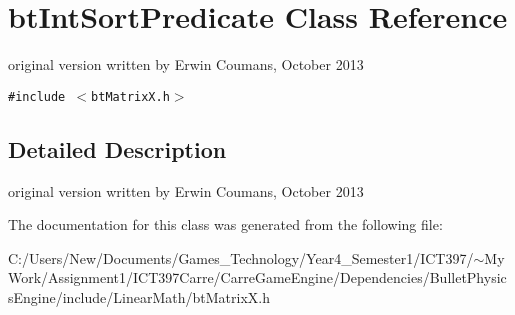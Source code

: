 \hypertarget{classbt_int_sort_predicate}{
\section{btIntSortPredicate Class Reference}
\label{classbt_int_sort_predicate}
}
original version written by Erwin Coumans, October 2013  


{\tt \#include $<$btMatrixX.h$>$}



\subsection{Detailed Description}
original version written by Erwin Coumans, October 2013 

The documentation for this class was generated from the following file:\begin{CompactItemize}
\item 
C:/Users/New/Documents/Games\_\-Technology/Year4\_\-Semester1/ICT397/$\sim$My Work/Assignment1/ICT397Carre/CarreGameEngine/Dependencies/BulletPhysicsEngine/include/LinearMath/btMatrixX.h\end{CompactItemize}
